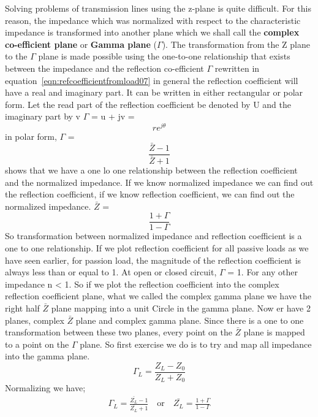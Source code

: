 Solving problems of transmission lines using the z-plane is quite difficult. For this reason, the impedance which was normalized with respect to the characteristic impedance is transformed into another plane which we shall call the \textbf{complex co-efficient plane} or \textbf{Gamma plane} ($\Gamma$).
The transformation from the Z plane to the $\Gamma$ plane is made possible using the one-to-one relationship that exists between the impedance and the reflection co-efficient $\Gamma$ rewritten in  equation~\eqref{eqn:refcoefficientfromload07}
in general the reflection coefficient will have a real and imaginary part. It can be written in either rectangular or polar form. Let the read part of the reflection coefficient be denoted by U and the imaginary part by v
$\Gamma$ = u + jv = \[ re^{j\theta} \] in polar form,  $\Gamma$ = \[ \frac{\bar{Z} - 1}{\bar{Z} + 1} \] shows that we have a one lo one relationship between the reflection coefficient and the normalized impedance. If we know normalized impedance we can find out the reflection coefficient, if we know reflection coefficient, we can find out the normalized impedance. $\bar{Z}$ = \[ \frac{1 + \Gamma}{1 - \Gamma} \] So transformation between normalized impedance and reflection coefficient is a one to one relationship. If we plot reflection coefficient for all passive loads as we have seen earlier, for passion load, the magnitude of the reflection coefficient is always less than or equal to 1. At open or closed circuit, $\Gamma$ = 1. For any other impedance n < 1. So if we plot the reflection coefficient into the complex reflection coefficient plane, what we called the complex gamma plane we have the right half $\bar{Z}$ plane mapping into a unit Circle in the gamma plane. Now er have 2 planes, complex $\bar{Z}$ plane and complex gamma plane. Since there is a one to one transformation between these two planes, every point on the $\bar{Z}$ plane is mapped to a point on the $\Gamma$ plane. So first exercise we do is to try and map all impedance into the gamma plane.
\begin{equation}
\Gamma_L = \frac{Z_L - Z_0}{Z_L + Z_0}\label{eqn:refcoefficientfromload07}
\end{equation}
Normalizing we have;
\begin{align*}
\Gamma_L = \frac{\bar{Z_L} - 1}{\bar{Z_L} + 1}\quad\text{or}\quad\bar{Z_L}= \frac{1 + \Gamma}{1 - \Gamma}
\end{align*}

